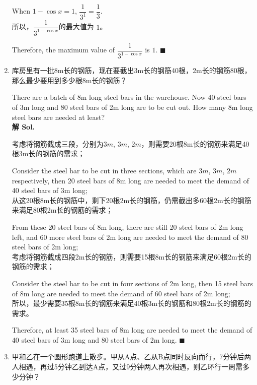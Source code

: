 \documentclass{ctexart}
\begin{document}
\begin{enumerate}
          When $ 1 - \cos x = 1$, $\dfrac{1}{3^1} = \dfrac{1}{3}$.\\

          所以，$\dfrac{1}{3^{1-\cos x}}$的最大值为 $1$。

          Therefore, the maximum value of $\dfrac{1}{3^{1-\cos x}}$ is $1$. \hfill
          $\blacksquare$

    \item 库房里有一批8m长的钢筋，现在要截出3m长的钢筋40根，2m长的钢筋80根，那么最少要用到多少根8m长的钢筋？

          There are a batch of 8m long steel bars in the warehouse. Now 40 steel bars of
          3m long and 80 steel bars of 2m long are to be cut out. How many 8m long steel
          bars are needed at least? \\

          \textbf{解 Sol.}

          考虑将钢筋截成三段，分别为$3m$, $3m$, $2m$，则需要20根8m长的钢筋来满足40根3m长的钢筋的需求；

          Consider the steel bar to be cut in three sections, which are $3m$, $3m$, $2m$
          respectively, then 20 steel bars of 8m long are needed to meet the demand of 40
          steel bars of 3m long;\\

          从这20根8m长的钢筋中，剩下20根2m长的钢筋，仍需截出多60根2m长的钢筋来满足80根2m长的钢筋的需求；

          From these 20 steel bars of 8m long, there are still 20 steel bars of 2m long
          left, and 60 more steel bars of 2m long are needed to meet the demand of 80
          steel bars of 2m long;\\

          考虑将钢筋截成四段2m长的钢筋，则需要15根8m长的钢筋来满足60根2m长的钢筋的需求；

          Consider the steel bar to be cut in four sections of 2m long, then 15 steel
          bars of 8m long are needed to meet the demand of 60 steel bars of 2m long;\\

          所以，最少需要35根8m长的钢筋来满足40根3m长的钢筋和80根2m长的钢筋的需求。

          Therefore, at least 35 steel bars of 8m long are needed to meet the demand of
          40 steel bars of 3m long and 80 steel bars of 2m long. \hfill $\blacksquare$

    \item 甲和乙在一个圆形跑道上散步。甲从A点、乙从B点同时反向而行，7分钟后两人相遇，再过5分钟乙到达A点，又过9分钟两人再次相遇，则乙环行一周需多少分钟？


\end{enumerate}
\end{document}
